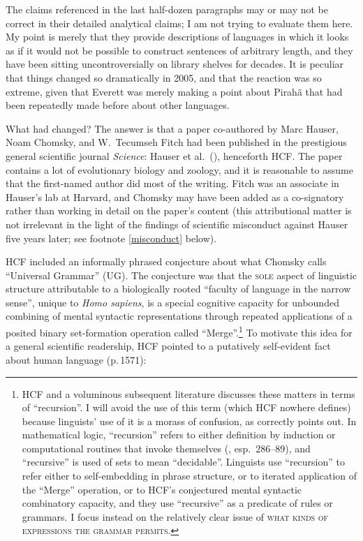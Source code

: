 \documentclass[output=paper,colorlinks,citecolor=brown
]{langscibook}
\begin{document}
The claims referenced in the last half-dozen paragraphs may or may not
be correct in their detailed analytical claims; I am not trying to
evaluate them here. My point is merely that they provide descriptions
of languages in which it looks as if it would not be possible to
construct sentences of arbitrary length, and they have been sitting
uncontroversially on library shelves for decades. It is peculiar that
things changed so dramatically in 2005, and that the reaction was so
extreme, given that Everett was merely making a point about Pirah{\~a}
that had been repeatedly made before about other languages.

What had changed? The answer is that a paper co-authored by Marc
Hauser, Noam Chomsky, and W.\ Tecumseh Fitch had been published in
the prestigious general scientific journal \textit{Science}: Hauser
et al.\ (\citeyear{HauChoFit02}), henceforth HCF. The paper contains
a lot of evolutionary biology and zoology, and it is reasonable to
assume that the first-named author did most of the writing. Fitch was
an associate in Hauser's lab at Harvard, and Chomsky may have been
added as a co-signatory rather than working in detail on the paper's
content (this attributional matter is not irrelevant in the light of
the findings of scientific misconduct against Hauser five years later;
see footnote \ref{misconduct} below).

HCF included an informally phrased conjecture about what Chomsky calls
``Universal Grammar'' (UG). The conjecture was that the \textsc{sole}
aspect of linguistic structure attributable to a biologically rooted
``faculty of language in the narrow sense'', unique to \textit{Homo sapiens},
is a special cognitive capacity for unbounded combining of mental
syntactic representations through repeated applications of a posited
binary set-formation operation called ``Merge''.\footnote{%
   HCF and a voluminous subsequent literature discusses these matters
   in terms of ``recursion''. I will avoid the use of this term (which
   HCF nowhere defines) because linguists' use of it is a morass of
   confusion, as \citet{Lobina14} correctly points out. In mathematical
   logic, ``recursion'' refers to either definition by induction or
   computational routines that invoke themselves (\citealt{Soare96},
   esp.\ 286--89), and ``recursive'' is used of sets to mean ``decidable''.
   Linguists use ``recursion'' to refer either to self-embedding in
   phrase structure, or to iterated application of the ``Merge''
   operation, or to HCF's conjectured mental syntactic combinatory
   capacity, and they use ``recursive'' as a predicate of rules or
   grammars. I focus instead on the relatively clear issue of
   \textsc{what kinds of expressions the grammar permits}.}
To motivate this idea for a general scientific readership, HCF pointed
to a putatively self-evident fact about human language (p.\,1571):
\end{document}
